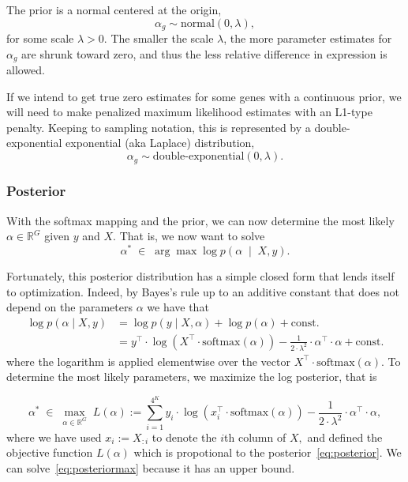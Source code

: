 \documentclass[11pt]{article}
\begin{document}
The prior is a normal centered at the origin,
\[
  \alpha_g \sim \textrm{normal}(0, \lambda),
\]
for some scale $\lambda > 0$.  The smaller the scale $\lambda$, the
more parameter estimates for $\alpha_g$ are shrunk toward zero, and
thus the less relative difference in expression is allowed.

If we intend to get true zero estimates for some genes with a
continuous prior, we will need to make penalized maximum likelihood
estimates with an L1-type penalty.  Keeping to sampling notation, this
is represented by a double-exponential exponential (aka Laplace)
distribution,
\[
  \alpha_g \sim \textrm{double-exponential}(0, \lambda).
\]


\subsubsection{Posterior}

With the softmax mapping and the prior, we can now determine the most likely 
$\alpha \in \mathbb{R}^{G}$ given $y$ and $X$. That is, we now want to solve
\begin{equation}
\alpha^* \; \in \; \arg \max \log p(\alpha \; \mid \; X,y).
\end{equation}

Fortunately, this posterior distribution has a simple closed form that lends itself to optimization.
 Indeed, by Bayes's rule up to an additive constant
that does not depend on the parameters $\alpha$ we have that
\begin{align}\nonumber
  \log p(\alpha \mid X, y)& = \log p(y \mid X, \alpha) + \log p(\alpha) +
  \textrm{const.}  \\
  &= y^{\top} \cdot \log \left( X^{\top} \cdot \textrm{softmax}(\alpha) \right)
          - \frac{1}{2 \cdot \lambda^2} \cdot \alpha^{\top} \cdot \alpha +\textrm{const.}  \label{eq:posterior} 
\end{align} 
 where the logarithm is applied elementwise over the vector $ X^{\top} \cdot \textrm{softmax}(\alpha).$ To determine the most likely parameters, we maximize the log posterior, that is
 
 \begin{equation} \label{eq:posteriormax} 
 \alpha^* \; \in \; \max_{\alpha \in \mathbb{R}^G} \; L(\alpha) :=  \sum_{i=1}^{4^K} y_i \cdot \log \left( x_i^\top \cdot \textrm{softmax}(\alpha) \right)
          - \frac{1}{2 \cdot \lambda^2} \cdot \alpha^{\top} \cdot \alpha,
 \end{equation}
where we have used $x_i := X_{:i}$ to denote the $i$th column of $X,$ and defined the objective function $L(\alpha)$ which is propotional to the posterior~\eqref{eq:posterior}.
We can solve~\eqref{eq:posteriormax} because it has an upper bound. 
\end{document}

